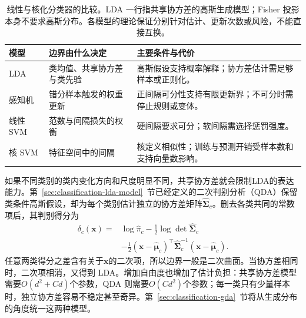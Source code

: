 \begin{table}[htbp]
  \centering
  \small
  \begin{tabularx}{\linewidth}{@{}>{\raggedright\arraybackslash}p{18mm}>{\raggedright\arraybackslash}X>{\raggedright\arraybackslash}X@{}}
    \toprule
    模型 & 边界由什么决定 & 主要条件与代价 \\
    \midrule
    LDA & 类均值、共享协方差与类先验 & 高斯假设支持概率解释；协方差估计需足够样本或正则化。 \\
    感知机 & 错分样本触发的权重更新 & 正间隔可分性支持有限更新界；不可分时需停止规则或变体。 \\
    线性 SVM & 范数与间隔损失的权衡 & 硬间隔要求可分；软间隔需选择惩罚强度。 \\
    核 SVM & 特征空间中的间隔 & 核定义相似性；训练与预测开销受样本数和支持向量数影响。 \\
    \bottomrule
  \end{tabularx}
  \caption{线性与核化分类器的比较。LDA 一行指共享协方差的高斯生成模型；Fisher 投影本身不要求高斯分布。各模型的理论保证分别针对估计、更新次数或风险，不能直接互换。}
  \label{tab:classification-linear-comparison}
\end{table}

如果不同类别的类内变化方向和尺度明显不同，共享协方差就会限制LDA的表达能力。第~\ref{sec:classification-lda-model}~节已经定义的二次判别分析（QDA）保留类条件高斯假设，却为每个类别估计独立的协方差矩阵$\hat{\bm{\Sigma}}_c$。删去各类共同的常数项后，其判别得分为
\begin{equation}
  \begin{aligned}
    \delta_c(\bm{x})
      ={}&\log\hat{\pi}_c-\frac12\log\det\hat{\bm{\Sigma}}_c\\
        &-\frac12(\bm{x}-\hat{\bm{\mu}}_c)^\top
          \hat{\bm{\Sigma}}_c^{-1}(\bm{x}-\hat{\bm{\mu}}_c).
  \end{aligned}
  \label{eq:classification-qda-score}
\end{equation}
任意两类得分之差含有关于$\bm{x}$的二次项，所以边界一般是二次曲面。当协方差相同时，二次项相消，又得到 LDA。增加自由度也增加了估计负担：共享协方差模型需要$O(d^2+Cd)$个参数，QDA 则需要$O(Cd^2)$个参数；每一类只有少量样本时，独立协方差容易不稳定甚至奇异。第~\ref{sec:classification-gda}~节将从生成分布的角度统一这两种模型。

